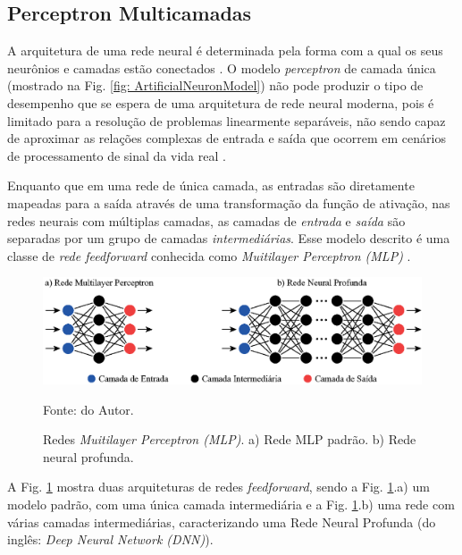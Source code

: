 \subsection{Perceptron Multicamadas}

A arquitetura de uma rede neural é determinada pela forma com a qual os seus neurônios e camadas estão conectados \cite{haykin2007redes}. O modelo \textit{perceptron} de camada única (mostrado na Fig. \ref{fig: ArtificialNeuronModel}) não pode produzir o tipo de desempenho que se espera de uma arquitetura de rede neural moderna, pois é limitado para a resolução de problemas linearmente separáveis, não sendo capaz de aproximar as relações complexas de entrada e saída que ocorrem em cenários de processamento de sinal da vida real \cite{aggarwal2018neural,haykin2007redes}.

Enquanto que em uma rede de única camada, as entradas são diretamente mapeadas para a saída através de uma transformação da função de ativação, nas redes neurais com múltiplas camadas, as camadas de \textit{entrada} e \textit{saída} são separadas por um grupo de camadas \textit{intermediárias}. Esse modelo descrito é uma classe de \textit{rede feedforward} conhecida como \textit{Muitilayer Perceptron (MLP)} \cite{aggarwal2018neural,haykin2007redes}.

\begin{figure}[H]
    \centering
    \includegraphics{04-Figuras/NeuralNetworkAndDeepLearning.eps}
    \caption{Redes \textit{Muitilayer Perceptron (MLP)}. a) Rede MLP padrão. b) Rede neural profunda.} \par
    Fonte: do Autor.
    \label{fig: NeuralNetworkAndDeepLearning}
\end{figure}

A Fig. \ref{fig: NeuralNetworkAndDeepLearning} mostra duas arquiteturas de redes \textit{feedforward}, sendo a Fig. \ref{fig: NeuralNetworkAndDeepLearning}.a) um modelo padrão, com uma única camada intermediária e a Fig. \ref{fig: NeuralNetworkAndDeepLearning}.b) uma rede com várias camadas intermediárias, caracterizando uma Rede Neural Profunda (do inglês: \textit{Deep Neural Network (DNN)}). 

